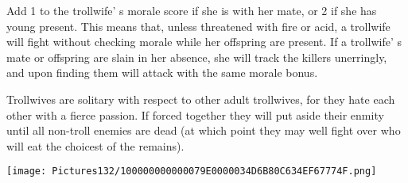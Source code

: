 \documentclass[a4paper,twoside,openany,10pt]{book}
\begin{document}
\begin{multicols}{2}
Add 1 to the trollwife' s morale score if she is with her mate, or 2 if she has young present. This means that, unless threatened with fire or acid, a trollwife will fight without checking morale while her offspring are present. If a trollwife' s mate or offspring are slain in her absence, she will track the killers unerringly, and upon finding them will attack with the same morale bonus.

Trollwives are solitary with respect to other adult trollwives, for they hate each other with a fierce passion. If forced together they will put aside their enmity until all non-troll enemies are dead (at which point they may well fight over who will eat the choicest of the remains). 

\end{multicols}

\begin{center} \texttt{[image: Pictures132/100000000000079E0000034D6B80C634EF67774F.png]} \end{center}
\end{document}

